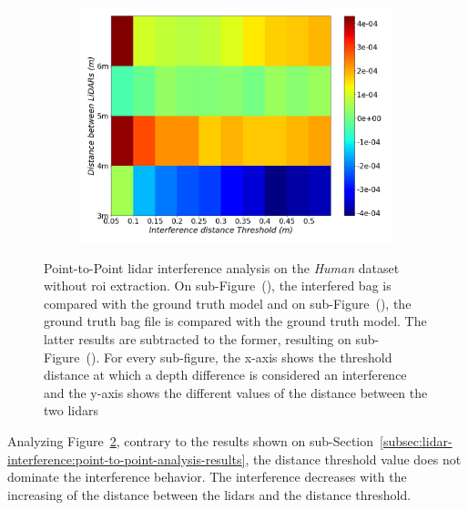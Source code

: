 \begin{figure}[!ht]
	\begin{subfigure}[c]{0.6\textwidth}
		\centering
		\includegraphics[width=\textwidth]{img/lidar-interference/human/difference_ground_truth_interference_measurement.png}
		\caption{}
		\label{fig:human:difference-color-mesh}
	\end{subfigure}

	\caption[Point-to-Point analysis of the interference on the \textit{Human} dataset without \ac{roi} extraction. Results are presented for the ground-truth bag, interference bag and the subtraction of the results between the two.]{Point-to-Point \ac{lidar} interference analysis on the \textit{Human} dataset without \ac{roi} extraction. On sub-Figure~(), the interfered bag is compared with the ground truth model and on sub-Figure~(), the ground truth bag file is compared with the ground truth model. The latter results are subtracted to the former, resulting on sub-Figure~(). For every sub-figure, the x-axis shows the threshold distance at which a depth difference is considered an interference and the y-axis shows the different values of the distance between the two \acp{lidar}} 
	\label{fig:human:color-mesh}
\end{figure}

Analyzing Figure~\ref{fig:human:color-mesh}, contrary to the results shown on sub-Section~\ref{subsec:lidar-interference:point-to-point-analysis-results}, the distance threshold value does not dominate the interference behavior. The interference decreases with the increasing of the distance between the \acp{lidar} and the distance threshold.

